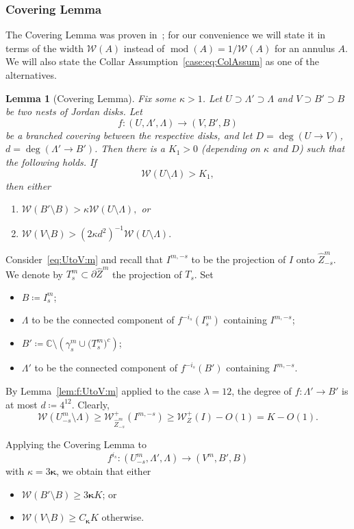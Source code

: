 \documentclass{amsart}
\newcommand{\1}{{\mathbb 1 }}
\newcommand{\bkappa}{{\boldsymbol\kappa}}
\newcommand{\Width}{{\mathcal W}}
\newcommand{\wZ}{{\widehat Z}}
\newcommand{\C}{\mathbb{C}}
\newtheorem{lem}[thm]{Lemma}
\theoremstyle{remark}
\numberwithin{equation}{section}
\theoremstyle{definition}
\renewcommand{\mod}{\operatorname{mod}}
\begin{document}
\subsubsection{Covering Lemma}
The Covering Lemma was proven in~\cite{KL}; for our convenience we will state it in terms of the width $\Width(A)$ instead of $\mod(A)=1/\Width(A)$ for an annulus $A$. We will also state the Collar Assumption~\eqref{case:eq:ColAssum}  as one of the alternatives.

\begin{lem}[Covering Lemma]
\label{lem:CovLmm}
 Fix some $\kappa >1$. Let $U \supset  \Lambda' \supset \Lambda$ and
$V \supset B'\supset B$ be two nests of Jordan disks. Let \[f : (U,\Lambda'
, \Lambda) \to (V, B'
, B)\]  be a branched covering between the respective disks, and let
$D = \deg(U \to  V )$, $d = \deg(\Lambda' \to B'
)$. Then there is a $K_1>0 $ (depending on $\kappa$ and $D$) such that the following holds. If 
\[ \Width( U\setminus \Lambda) >K_1 ,\] then either
\begin{enumerate}
\item $\Width(B' \setminus B) > \kappa \Width(U \setminus \Lambda),$ \label{case:eq:ColAssum} or
\item $\Width( V \setminus B) >\left(2\kappa d^2 \right)^{-1}\Width (U\setminus \Lambda).$
\end{enumerate}
\end{lem}




Consider~\eqref{eq:UtoV:m}  and recall that $I^{m,-s}$ to be the projection of $I$ onto $\wZ^m_{-s}$. We denote by $T^m_s\subset \partial \wZ^m$ the projection of $T_s$. Set  
\begin{itemize}
\item $B\coloneqq I^m_s$;
\item $\Lambda$ to be the connected component of $f^{-i_s}(I^m_s)$ containing $I^{m,-s}$;
\item $B'\coloneqq  \C\setminus \left(\gamma^m_s\cup \big(T^m_s\big)^c\right)$;
\item $\Lambda'$ to be the connected component of $f^{-i_s}(B')$ containing $
I^{m,-s}$. 
\end{itemize}

By Lemma~\ref{lem:f:UtoV:m} applied to the case $\lambda=12$, the degree of $f\colon \Lambda' \to B'$ is at most $d\coloneqq 4^{12}$. Clearly, 
\[\Width(U^m_{-s}\setminus \Lambda) \ge \Width^+_{\wZ^m_{-s}}(I^{m,-s}) \ge \Width^+_{Z}(I) -O(1)= K-O(1).\]

 Applying the Covering Lemma to 
 \[f^{i_s}\colon (U^m_{-s},\Lambda' , \Lambda)\to (V^m,B',B)\] with $\kappa=3\bkappa $, we obtain that either
\begin{itemize}
\item $\Width(B'\setminus B) \ge 3\bkappa  K$; or
\item $\Width(V\setminus  B) \ge C_{\bkappa} K$ otherwise.
\end{itemize} 
 
\end{document}
